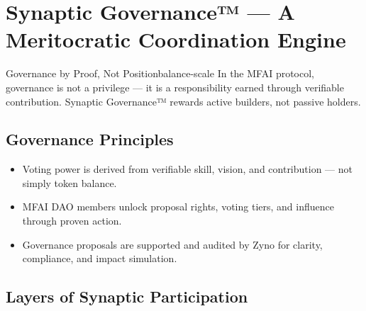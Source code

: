 \section{Synaptic Governance™ — A Meritocratic Coordination Engine}

\begin{mfai-box}{Governance by Proof, Not Position}{balance-scale}
In the MFAI protocol, governance is not a privilege — it is a responsibility earned through verifiable contribution. Synaptic Governance™ rewards active builders, not passive holders.
\end{mfai-box}

\vspace{1em}

\subsection*{Governance Principles}

\begin{itemize}
  \item {} Voting power is derived from verifiable skill, vision, and contribution — not simply token balance.
  \item {} MFAI DAO members unlock proposal rights, voting tiers, and influence through proven action.
  \item {} Governance proposals are supported and audited by Zyno for clarity, compliance, and impact simulation.
\end{itemize}

\vspace{1em}

\subsection*{Layers of Synaptic Participation}

\begin{center}
\end{center}

